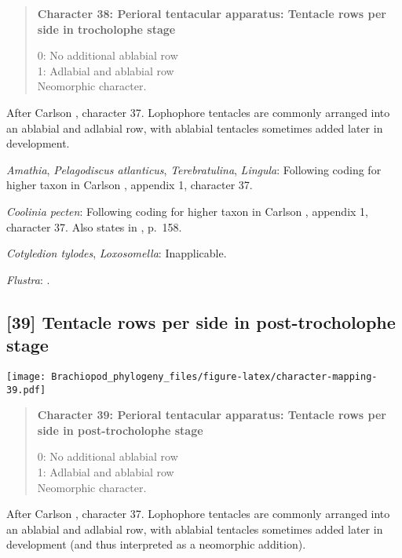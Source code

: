 \documentclass[openany]{book}
\theoremstyle{definition}
\theoremstyle{definition}
\theoremstyle{definition}
\theoremstyle{remark}
\begin{document}
\begin{quote}
\textbf{Character 38: Perioral tentacular apparatus: Tentacle rows per
side in trocholophe stage}

0: No additional ablabial row\\
1: Adlabial and ablabial row\\
Neomorphic character.
\end{quote}

After Carlson \citeyearpar{Carlson1995Phylogeneticrelationships},
character 37. Lophophore tentacles are commonly arranged into an
ablabial and adlabial row, with ablabial tentacles sometimes added later
in development.

\hypertarget{Amathia-coding-38}{}
\emph{Amathia}, \emph{Pelagodiscus atlanticus}, \emph{Terebratulina},
\emph{Lingula}: Following coding for higher taxon in Carlson
\citeyearpar{Carlson1995Phylogeneticrelationships}, appendix 1,
character 37.

\hypertarget{Coolinia_pecten-coding-38}{}
\emph{Coolinia pecten}: Following coding for higher taxon in Carlson
\citeyearpar{Carlson1995Phylogeneticrelationships}, appendix 1,
character 37. Also states in
\citet{Williams2000LinguliformeaCraniiformea}, p.~158.

\hypertarget{Cotyledion_tylodes-coding-38}{}
\emph{Cotyledion tylodes}, \emph{Loxosomella}: Inapplicable.

\hypertarget{Flustra-coding-38}{}
\emph{Flustra}: \citep{Temereva2016Thenervous}.

\subsection*{{[}39{]} Tentacle rows per side in post-trocholophe
stage}\label{tentacle-rows-per-side-in-post-trocholophe-stage}

\texttt{[image: Brachiopod\_phylogeny\_files/figure-latex/character-mapping-39.pdf]}

\begin{quote}
\textbf{Character 39: Perioral tentacular apparatus: Tentacle rows per
side in post-trocholophe stage}

0: No additional ablabial row\\
1: Adlabial and ablabial row\\
Neomorphic character.
\end{quote}

After Carlson \citeyearpar{Carlson1995Phylogeneticrelationships},
character 37. Lophophore tentacles are commonly arranged into an
ablabial and adlabial row, with ablabial tentacles sometimes added later
in development (and thus interpreted as a neomorphic addition).
\end{document}
